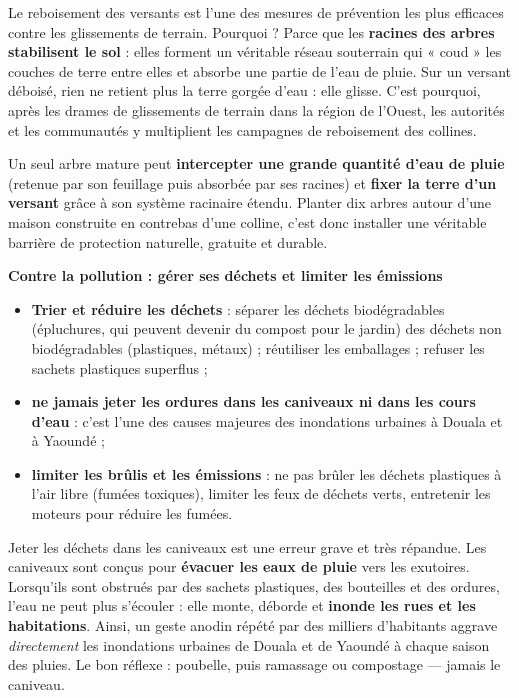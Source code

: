 \documentclass[11pt]{article}
\begin{document}
\begin{savaistu}
Le reboisement des versants est l'une des mesures de prévention les plus efficaces contre les glissements de terrain. Pourquoi ? Parce que les \textbf{racines des arbres stabilisent le sol} : elles forment un véritable réseau souterrain qui « coud » les couches de terre entre elles et absorbe une partie de l'eau de pluie. Sur un versant déboisé, rien ne retient plus la terre gorgée d'eau : elle glisse. C'est pourquoi, après les drames de glissements de terrain dans la région de l'Ouest, les autorités et les communautés y multiplient les campagnes de reboisement des collines.
\end{savaistu}

\begin{exemplebox}
Un seul arbre mature peut \textbf{intercepter une grande quantité d'eau de pluie} (retenue par son feuillage puis absorbée par ses racines) et \textbf{fixer la terre d'un versant} grâce à son système racinaire étendu. Planter dix arbres autour d'une maison construite en contrebas d'une colline, c'est donc installer une véritable barrière de protection naturelle, gratuite et durable.
\end{exemplebox}

\textbf{Contre la pollution : gérer ses déchets et limiter les émissions}\par

\begin{itemize}
\item \textbf{Trier et réduire les déchets} : séparer les déchets biodégradables (épluchures, qui peuvent devenir du compost pour le jardin) des déchets non biodégradables (plastiques, métaux) ; réutiliser les emballages ; refuser les sachets plastiques superflus ;
\item \textbf{ne jamais jeter les ordures dans les caniveaux ni dans les cours d'eau} : c'est l'une des causes majeures des inondations urbaines à Douala et à Yaoundé ;
\item \textbf{limiter les brûlis et les émissions} : ne pas brûler les déchets plastiques à l'air libre (fumées toxiques), limiter les feux de déchets verts, entretenir les moteurs pour réduire les fumées.
\end{itemize}

\begin{attention}
Jeter les déchets dans les caniveaux est une erreur grave et très répandue. Les caniveaux sont conçus pour \textbf{évacuer les eaux de pluie} vers les exutoires. Lorsqu'ils sont obstrués par des sachets plastiques, des bouteilles et des ordures, l'eau ne peut plus s'écouler : elle monte, déborde et \textbf{inonde les rues et les habitations}. Ainsi, un geste anodin répété par des milliers d'habitants aggrave \emph{directement} les inondations urbaines de Douala et de Yaoundé à chaque saison des pluies. Le bon réflexe : poubelle, puis ramassage ou compostage — jamais le caniveau.
\end{attention}
\end{document}
